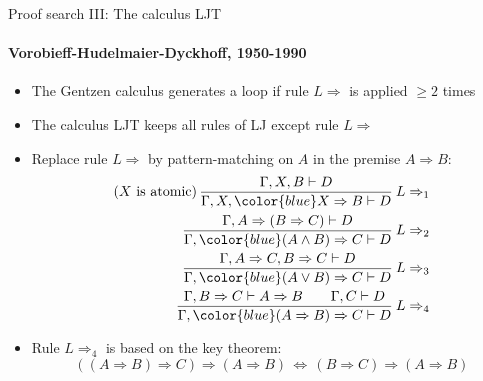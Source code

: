 \documentclass[english]{beamer}
\begin{document}
\begin{frame}{Proof search III: The calculus LJT}


\framesubtitle{Vorobieff-Hudelmaier-Dyckhoff, 1950-1990}
\begin{itemize}
\item The Gentzen calculus generates a loop if rule $L\Rightarrow$ is applied
$\geq2$ times
\item The calculus LJT keeps all rules of LJ except rule $L\Rightarrow$
\item Replace rule $L\Rightarrow$ by pattern-matching on $A$ in the premise
$A\Rightarrow B$:
\begin{align*}
\text{(}X\text{ is atomic)\,}\frac{\Gamma,X,B\vdash D}{\Gamma,X,{\color{blue}X\Rightarrow B}\vdash D}\:L\Rightarrow_{1}\\
\frac{\Gamma,A\Rightarrow(B\Rightarrow C)\vdash D}{\Gamma,{\color{blue}(A\wedge B)\Rightarrow C}\vdash D}\:L\Rightarrow_{2}\\
\frac{\Gamma,A\Rightarrow C,B\Rightarrow C\vdash D}{\Gamma,{\color{blue}(A\vee B)\Rightarrow C}\vdash D}\:L\Rightarrow_{3}\\
\frac{\Gamma,B\Rightarrow C\vdash A\Rightarrow B\quad\quad\Gamma,C\vdash D}{\Gamma,{\color{blue}(A\Rightarrow B)\Rightarrow C}\vdash D}\:L\Rightarrow_{4}
\end{align*}
\item Rule $L\Rightarrow_{4}$ is based on the key theorem: 
\[
\left(\left(A\Rightarrow B\right)\Rightarrow C\right)\Rightarrow\left(A\Rightarrow B\right)\,\Longleftrightarrow\,\left(B\Rightarrow C\right)\Rightarrow\left(A\Rightarrow B\right)
\]
\end{itemize}
\end{frame}
\end{document}
